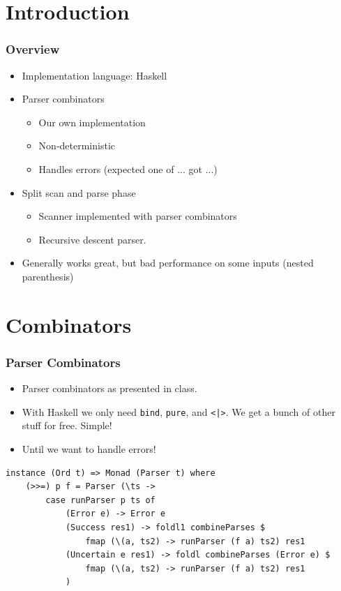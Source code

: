 \documentclass{beamer}
\begin{document}
\section{Introduction}
\begin{frame}
\frametitle{Overview}
\begin{itemize}
\item Implementation language: Haskell
\item Parser combinators
    \begin{itemize}
    \item Our own implementation
    \item Non-deterministic
    \item Handles errors (expected one of ... got ...)
    \end{itemize}
\item Split scan and parse phase
    \begin{itemize}
    \item Scanner implemented with parser combinators
    \item Recursive descent parser.
    \end{itemize}
\item Generally works great, but bad performance on some inputs (nested parenthesis)
\end{itemize}
\end{frame}

\section{Combinators}
\begin{frame}[fragile]

\frametitle{Parser Combinators}

\begin{itemize}
\item Parser combinators as presented in class.
\item With Haskell we only need \lstinline{bind}, \lstinline{pure}, and \lstinline{<|>}. We get a bunch of other stuff for free. Simple!
\item<2-> Until we want to handle errors!
\end{itemize}
\pause
\pause

\begin{lstlisting}
instance (Ord t) => Monad (Parser t) where
    (>>=) p f = Parser (\ts -> 
        case runParser p ts of
            (Error e) -> Error e
            (Success res1) -> foldl1 combineParses $
                fmap (\(a, ts2) -> runParser (f a) ts2) res1
            (Uncertain e res1) -> foldl combineParses (Error e) $
                fmap (\(a, ts2) -> runParser (f a) ts2) res1
            )
\end{lstlisting}

\end{frame}
\end{document}

